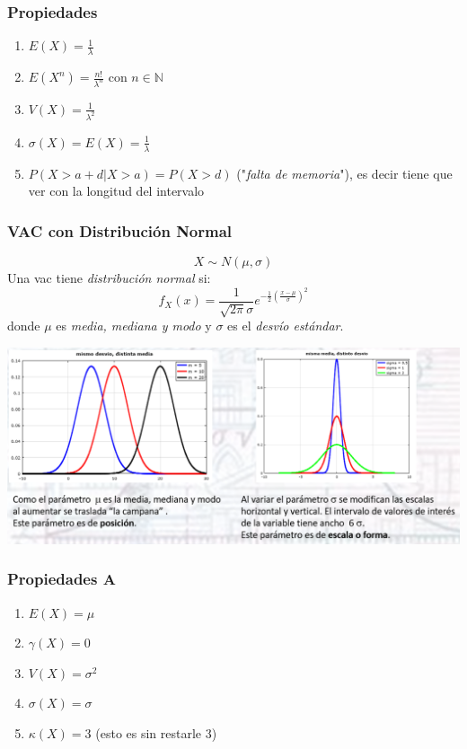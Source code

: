 \documentclass{article}
\newcommand{\naturales}{\mathbb{N}}                     %
\begin{document}
\subsubsection*{Propiedades}
\begin{enumerate}
    \item $E(X) = \frac{1}{\lambda}$
    \item $E(X^n) = \frac{n!}{\lambda^n}$ con $n \in \naturales$
    \item $V(X) =  \frac{1}{\lambda^2}$
    \item $\sigma(X) = E(X) = \frac{1}{\lambda}$
    \item $P(X > a + d | X > a) = P(X > d)$ ("\emph{falta de memoria}"), es decir tiene que ver con la longitud del intervalo
\end{enumerate}

\subsubsection{VAC con Distribución Normal}
\begin{equation*}
    X \sim N(\mu, \sigma)
\end{equation*}
Una vac tiene \emph{distribución normal} si:
\begin{equation*}
    f_X(x) = \frac{1}{\sqrt{2 \pi} \sigma} e^{-\frac{1}{2}(\frac{x - \mu}{\sigma})^2}
\end{equation*}
donde $\mu$ es \emph{media, mediana y modo} y $\sigma$ es el \emph{desvío estándar}.
\begin{center}
        \includegraphics[width=.70\textwidth]{Images/DistribucionNormalVAC.png}
\end{center} 

\subsubsection*{Propiedades A}
\begin{enumerate}
    \item $E(X) = \mu$
    \item $\gamma(X) = 0$
    \item $V(X) = \sigma^2$
    \item $\sigma(X) = \sigma$
    \item $\kappa(X) = 3$ (esto es sin restarle 3)
\end{enumerate}
\end{document}
